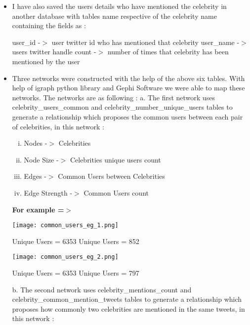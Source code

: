 \documentclass[runningheads,a4paper]{llncs}
\begin{document}
\begin{itemize}
\item	I have also saved the users details who have mentioned the celebrity in another database with tables name respective of the celebrity name containing the fields as : 
  
\subitem user\_id -$>$ user twitter id who has mentioned that celebrity
\subitem user\_name -$>$ users twitter handle
\subitem count -$>$ number of times that celebrity has been mentioned by the user

\item	Three networks were constructed with the help of the above six tables. With help of igraph python library and Gephi Software we were able to map these networks. The networks are as following : 
\vspace{0.1in}
\subitem	a. The first network uses celebrity\_users\_common and celebrity\_number\_unique\_users tables to generate a relationship which proposes the common users between each pair of celebrities, in this network :
\vspace{0.1in}
\begin{enumerate}[i.  ]
\addtolength{\itemindent}{1cm}
\item Nodes -$>$ Celebrities
\item Node Size -$>$ Celebrities unique users count
\item Edges -$>$ Common Users between Celebrities
\item Edge Strength -$>$ Common Users count
\end{enumerate}
\addtolength{\itemindent}{-0.5cm}
\vspace{0.1in}
\textbf{For example =$>$}
\begin{flushleft}
\centerline{\texttt{[image: common\_users\_eg\_1.png]}}
\centerline{Unique Users = 6353 \hspace{2cm} Unique Users = 852}
\vspace{0.2in}
\centerline{\texttt{[image: common\_users\_eg\_2.png]}}
\centerline{Unique Users = 6353 \hspace{2cm} Unique Users = 797}
\end{flushleft}
\subitem b. The second network uses celebrity\_mentions\_count and celebrity\_common\_mention\_tweets tables to generate a relationship which proposes how commonly two celebrities are mentioned in the same tweets, in this network :
\vspace{0.1in}
\begin{enumerate}[i.  ]

\end{enumerate}
\end{itemize}
\end{document}
